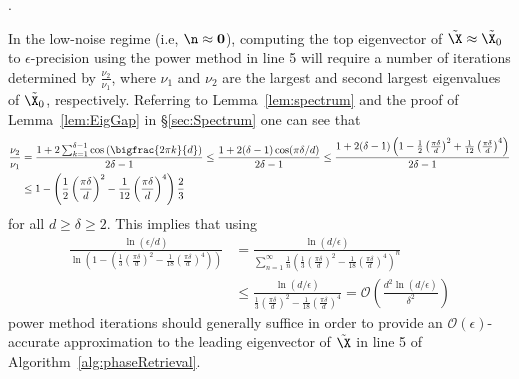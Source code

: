 . 

In the low-noise regime (i.e, $\n \approx {\bf 0}$), computing the top eigenvector of $\tilde{\X} \approx \tilde{\X_0}$ to $\epsilon$-precision using the power method in line 5 will require a number of iterations determined by $\frac{\nu_2}{\nu_1}$, where $\nu_1$ and $\nu_2$ are the largest and second largest eigenvalues of $\tilde{\X_0}$, respectively.  Referring to Lemma~\ref{lem:spectrum} and the proof of Lemma~\ref{lem:EigGap} in \S \ref{sec:Spectrum} one can see that
\begin{align*}
\frac{\nu_2}{\nu_1} &= \frac{1 + 2 \sum_{k = 1}^{\delta - 1}\cos\left(\bigfrac{2\pi k}{d}\right)}{2 \delta - 1} \leq \frac{1 + 2 (\delta - 1) \cos (\pi \delta / d)}{2 \delta - 1} \leq  \frac{1 + 2 (\delta - 1) \left(1 - \frac{1}{2} \left(\frac{\pi \delta}{d} \right)^2 + \frac{1}{12} \left(\frac{\pi \delta}{d} \right)^4 \right)}{2 \delta - 1}\\
& \leq 1 - \left(\frac{1}{2} \left(\frac{\pi \delta}{d} \right)^2 - \frac{1}{12} \left(\frac{\pi \delta}{d} \right)^4 \right)\frac{2}{3}
\end{align*}
for all $d \geq \delta \geq 2$.  This implies that using
\begin{align*}
\frac{\ln(\epsilon/d)}{\ln \left(1 - \left(\frac{1}{3} \left(\frac{\pi \delta}{d} \right)^2 - \frac{1}{18} \left(\frac{\pi \delta}{d} \right)^4 \right) \right)} &= \frac{\ln(d/ \epsilon)}{ \sum^{\infty}_{n=1} \frac{1}{n} \left(\frac{1}{3} \left(\frac{\pi \delta}{d} \right)^2 - \frac{1}{18} \left(\frac{\pi \delta}{d} \right)^4 \right)^n}\\ 
&\leq \frac{\ln(d/ \epsilon)}{ \frac{1}{3} \left(\frac{\pi \delta}{d} \right)^2 - \frac{1}{18} \left(\frac{\pi \delta}{d} \right)^4 } = \mathcal{O}\left( \frac{d^2 \ln (d/\epsilon)}{\delta^2} \right)
\end{align*}
power method iterations should generally suffice in order to provide an $\mathcal{O}(\epsilon)$-accurate approximation to the leading eigenvector of $\tilde{\X}$ in line 5 of Algorithm~\ref{alg:phaseRetrieval}.
